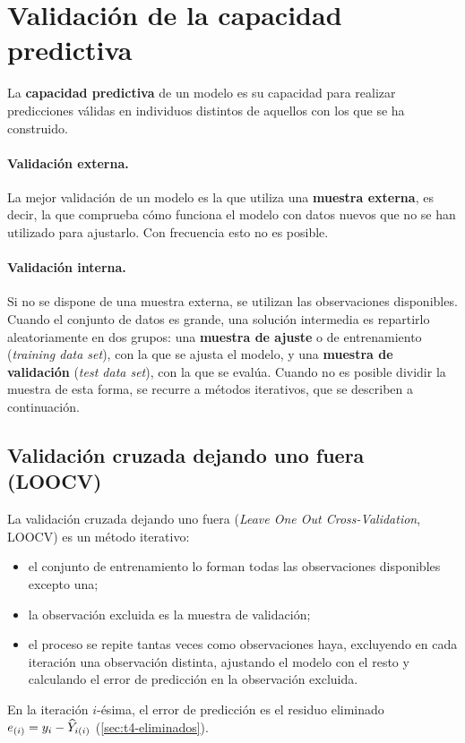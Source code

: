 \section{Validación de la capacidad predictiva}
\label{sec:t4-capacidad-predictiva}

La \textbf{capacidad predictiva} de un modelo es su capacidad para realizar predicciones válidas
en individuos distintos de aquellos con los que se ha construido.

\paragraph{Validación externa.} La mejor validación de un modelo es la que utiliza una
\textbf{muestra externa}, es decir, la que comprueba cómo funciona el modelo con datos nuevos que
no se han utilizado para ajustarlo. Con frecuencia esto no es posible.

\paragraph{Validación interna.} Si no se dispone de una muestra externa, se utilizan las
observaciones disponibles. Cuando el conjunto de datos es grande, una solución intermedia es
repartirlo aleatoriamente en dos grupos: una \textbf{muestra de ajuste} o de entrenamiento
(\emph{training data set}), con la que se ajusta el modelo, y una \textbf{muestra de validación}
(\emph{test data set}), con la que se evalúa. Cuando no es posible dividir la muestra de esta
forma, se recurre a métodos iterativos, que se describen a continuación.

\subsection{Validación cruzada dejando uno fuera (LOOCV)}

La validación cruzada dejando uno fuera (\emph{Leave One Out Cross-Validation}, LOOCV) es un
método iterativo:
\begin{itemize}
  \item el conjunto de entrenamiento lo forman todas las observaciones disponibles excepto una;
  \item la observación excluida es la muestra de validación;
  \item el proceso se repite tantas veces como observaciones haya, excluyendo en cada iteración
    una observación distinta, ajustando el modelo con el resto y calculando el error de
    predicción en la observación excluida.
\end{itemize}
En la iteración $i$-ésima, el error de predicción es el residuo eliminado
$e_{(i)}=y_i-\widehat{Y}_{i(i)}$ (\cref{sec:t4-eliminados}).

